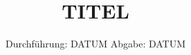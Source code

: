 




\subject{VERSUCH NUMMER}
\title{TITEL}
\date{%
  Durchführung: DATUM
  \hspace{3em}
  Abgabe: DATUM
}



\maketitle
\thispagestyle{empty}
\tableofcontents
\newpage






\printbibliography{}




